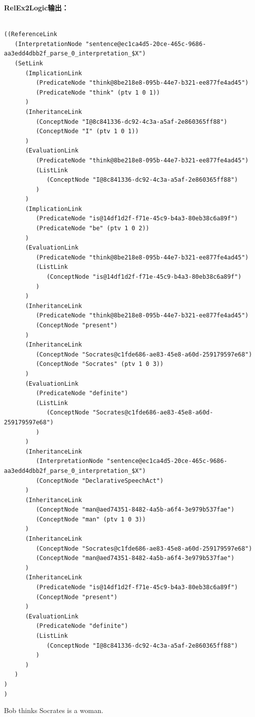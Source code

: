 {\bf RelEx2Logic输出：}

 {\tt\begin{small}\begin{lstlisting}

((ReferenceLink
   (InterpretationNode "sentence@ec1ca4d5-20ce-465c-9686-aa3edd4dbb2f_parse_0_interpretation_$X")
   (SetLink
      (ImplicationLink
         (PredicateNode "think@8be218e8-095b-44e7-b321-ee877fe4ad45")
         (PredicateNode "think" (ptv 1 0 1))
      )
      (InheritanceLink
         (ConceptNode "I@8c841336-dc92-4c3a-a5af-2e860365ff88")
         (ConceptNode "I" (ptv 1 0 1))
      )
      (EvaluationLink
         (PredicateNode "think@8be218e8-095b-44e7-b321-ee877fe4ad45")
         (ListLink
            (ConceptNode "I@8c841336-dc92-4c3a-a5af-2e860365ff88")
         )
      )
      (ImplicationLink
         (PredicateNode "is@14df1d2f-f71e-45c9-b4a3-80eb38c6a89f")
         (PredicateNode "be" (ptv 1 0 2))
      )
      (EvaluationLink
         (PredicateNode "think@8be218e8-095b-44e7-b321-ee877fe4ad45")
         (ListLink
            (ConceptNode "is@14df1d2f-f71e-45c9-b4a3-80eb38c6a89f")
         )
      )
      (InheritanceLink
         (PredicateNode "think@8be218e8-095b-44e7-b321-ee877fe4ad45")
         (ConceptNode "present")
      )
      (InheritanceLink
         (ConceptNode "Socrates@c1fde686-ae83-45e8-a60d-259179597e68")
         (ConceptNode "Socrates" (ptv 1 0 3))
      )
      (EvaluationLink
         (PredicateNode "definite")
         (ListLink
            (ConceptNode "Socrates@c1fde686-ae83-45e8-a60d-259179597e68")
         )
      )
      (InheritanceLink
         (InterpretationNode "sentence@ec1ca4d5-20ce-465c-9686-aa3edd4dbb2f_parse_0_interpretation_$X")
         (ConceptNode "DeclarativeSpeechAct")
      )
      (InheritanceLink
         (ConceptNode "man@aed74351-8482-4a5b-a6f4-3e979b537fae")
         (ConceptNode "man" (ptv 1 0 3))
      )
      (InheritanceLink
         (ConceptNode "Socrates@c1fde686-ae83-45e8-a60d-259179597e68")
         (ConceptNode "man@aed74351-8482-4a5b-a6f4-3e979b537fae")
      )
      (InheritanceLink
         (PredicateNode "is@14df1d2f-f71e-45c9-b4a3-80eb38c6a89f")
         (ConceptNode "present")
      )
      (EvaluationLink
         (PredicateNode "definite")
         (ListLink
            (ConceptNode "I@8c841336-dc92-4c3a-a5af-2e860365ff88")
         )
      )
   )
)
)
\end{lstlisting}\end{small}}

  Bob thinks Socrates is a woman.

